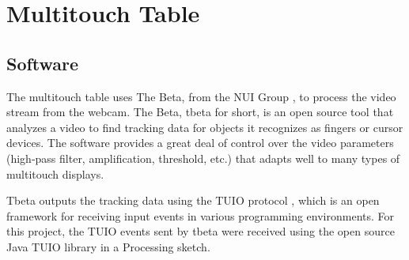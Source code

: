\section{Multitouch Table}
\subsection{Software}
The multitouch table uses The Beta, from the NUI Group \cite{NUI}, to process the video stream from the webcam. The Beta, tbeta for short, is an open source tool that analyzes a video to find tracking data for objects it recognizes as fingers or cursor devices. The software provides a great deal of control over the video parameters (high-pass filter, amplification, threshold, etc.) that adapts well to many types of multitouch displays.

Tbeta outputs the tracking data using the TUIO protocol \cite{TUIO}, which is an open framework for receiving input events in various programming environments. For this project, the TUIO events sent by tbeta were received using the open source Java TUIO library in a Processing sketch. 
